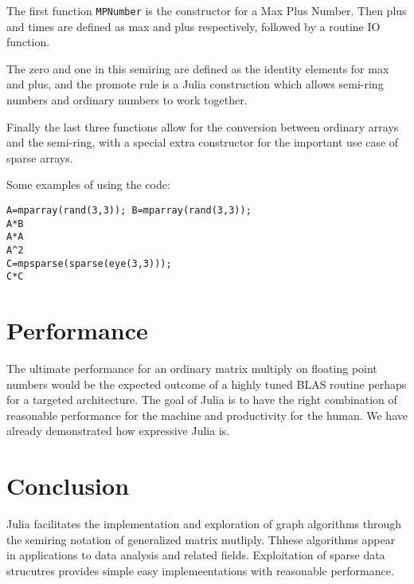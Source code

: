 \documentclass[conference]{IEEEtran}
\begin{document}
The first function \verb+MPNumber+ is the constructor for a Max Plus Number.
Then plus and times are defined as max and plus respectively, followed by 
a routine IO function.

The zero and one in this semiring are defined as the identity elements for max and plus,
and the promote rule is a Julia construction which allows semi-ring numbers and ordinary
numbers to work together.

Finally the last three functions allow for the conversion between ordinary arrays and the semi-ring, with a special extra constructor for the important use case of sparse arrays.

Some examples of using the code:


\begin{verbatim}
A=mparray(rand(3,3)); B=mparray(rand(3,3));
A*B
A*A
A^2
C=mpsparse(sparse(eye(3,3)));
C*C
\end{verbatim}





\section{Performance}

The ultimate performance for an ordinary matrix multiply on floating point numbers 
would be the expected outcome of a highly tuned BLAS routine perhaps for a targeted
architecture.  The goal of Julia is to have the right combination of reasonable performance
for the machine and productivity for the human.  We have already demonstrated how expressive
Julia is.


\section{Conclusion}

Julia facilitates the implementation and exploration of graph algorithms through
the semiring notation of generalized matrix mutliply.  Thhese algorithms appear
in applications to data analysis and related fields.  Exploitation of sparse data 
strucutres provides simple easy implemeentations with reasonable performance.



\end{document}
